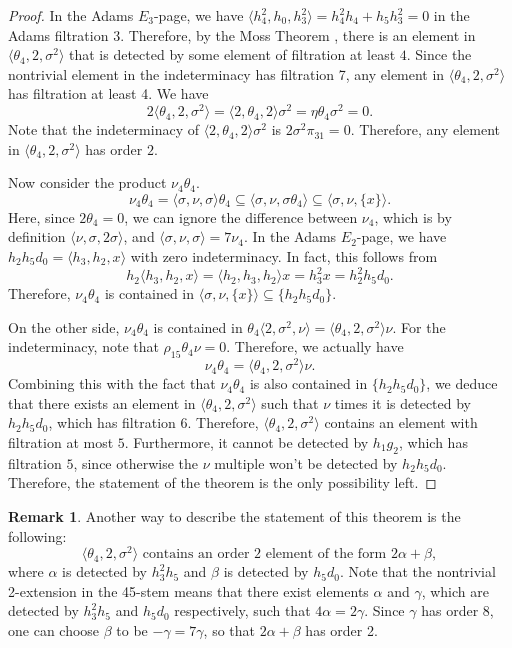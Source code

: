 \documentclass[psamsfonts]{amsart}
\theoremstyle{definition}
\newtheorem{rem}[thm]{Remark}
\numberwithin{equation}{section}
\begin{document}
\begin{proof}
In the Adams $E_3$-page, we have $\langle h_4^2, h_0, h_3^2\rangle=h_4^2h_4+h_5h_3^2=0$ in the Adams filtration 3. Therefore, by the Moss Theorem \cite{Moss}, there is an element in $\langle \theta_4, 2, \sigma^2\rangle$ that is detected by some element of filtration at least $4$. Since the nontrivial element in the indeterminacy has filtration 7, any element in $\langle \theta_4, 2, \sigma^2\rangle$ has filtration at least 4. We have
$$2\langle \theta_4, 2, \sigma^2\rangle=\langle2, \theta_4, 2\rangle\sigma^2=\eta\theta_4\sigma^2=0.$$
Note that the indeterminacy of $\langle2, \theta_4, 2\rangle\sigma^2$ is $2\sigma^2\pi_{31}=0$. Therefore, any element in $\langle \theta_4, 2, \sigma^2\rangle$ has order $2$.

Now consider the product $\nu_4\theta_4$.
$$\nu_4\theta_4=\langle\sigma,\nu,\sigma\rangle\theta_4 \subseteq\langle\sigma,\nu,\sigma\theta_4\rangle\subseteq\langle\sigma,\nu,\{x\}\rangle.$$
Here, since $2\theta_4=0$, we can ignore the difference between $\nu_4$, which is by definition $\langle\nu,\sigma,2\sigma\rangle$, and $\langle\sigma,\nu,\sigma\rangle=7\nu_4$. In the Adams $E_2$-page, we have $h_2h_5d_0=\langle h_3,h_2,x\rangle$ with zero indeterminacy. In fact, this follows from
$$h_2\langle h_3,h_2,x\rangle=\langle h_2,h_3,h_2\rangle x=h_3^2x=h_2^2h_5d_0.$$ Therefore, $\nu_4\theta_4$ is contained in $\langle\sigma,\nu,\{x\}\rangle\subseteq\{h_2h_5d_0\}$.

On the other side, $\nu_4\theta_4$ is contained in $\theta_4\langle2, \sigma^2, \nu\rangle=\langle\theta_4,2,\sigma^2\rangle\nu$. For the indeterminacy, note that $\rho_{15}\theta_4\nu=0.$ Therefore, we actually have $$\nu_4\theta_4=\langle\theta_4,2,\sigma^2\rangle\nu.$$
Combining this with the fact that $\nu_4\theta_4$ is also contained in $\{h_2h_5d_0\}$, we deduce that there exists an element in $\langle \theta_4, 2, \sigma^2\rangle$ such that $\nu$ times it is detected by $h_2h_5d_0$, which has filtration $6$. Therefore, $\langle \theta_4, 2, \sigma^2\rangle$ contains an element with filtration at most $5$. Furthermore, it cannot be detected by $h_1g_2$, which has filtration $5$, since otherwise the $\nu$ multiple won't be detected by $h_2h_5d_0$. Therefore, the statement of the theorem is the only possibility left.
\end{proof}

\begin{rem}
Another way to describe the statement of this theorem is the following:
$$\langle \theta_4, 2, \sigma^2\rangle \text{~contains an order 2 element of the form~} 2\alpha+\beta,$$
where $\alpha$ is detected by $h_3^2h_5$ and $\beta$ is detected by $h_5d_0$. Note that the nontrivial 2-extension in the 45-stem means that there exist elements $\alpha$ and $\gamma$, which are detected by $h_3^2h_5$ and $h_5d_0$ respectively, such that $4\alpha =  2\gamma$. Since $\gamma$ has order 8, one can choose $\beta$ to be $-\gamma=7\gamma$, so that $2\alpha+\beta$ has order 2.
\end{rem}
\end{document}
